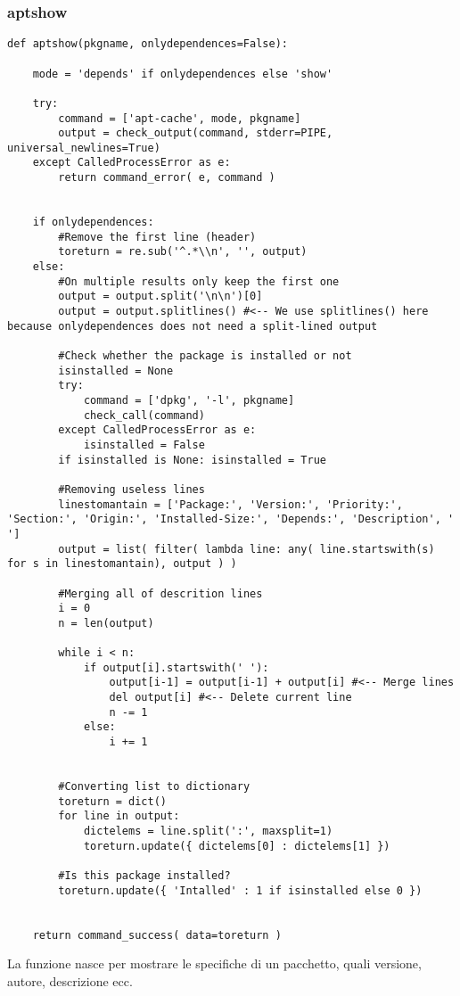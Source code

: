 \documentclass[11pt]{article}
\begin{document}
\subsubsection{aptshow}\label{aptshow}
\begin{lstlisting}
def aptshow(pkgname, onlydependences=False):
    
    mode = 'depends' if onlydependences else 'show'

    try:
        command = ['apt-cache', mode, pkgname]
        output = check_output(command, stderr=PIPE, universal_newlines=True)
    except CalledProcessError as e:
        return command_error( e, command )
    

    if onlydependences:
        #Remove the first line (header)
        toreturn = re.sub('^.*\\n', '', output)
    else:
        #On multiple results only keep the first one
        output = output.split('\n\n')[0]
        output = output.splitlines() #<-- We use splitlines() here because onlydependences does not need a split-lined output

        #Check whether the package is installed or not
        isinstalled = None
        try:
            command = ['dpkg', '-l', pkgname]
            check_call(command)
        except CalledProcessError as e:
            isinstalled = False
        if isinstalled is None: isinstalled = True
     
        #Removing useless lines
        linestomantain = ['Package:', 'Version:', 'Priority:', 'Section:', 'Origin:', 'Installed-Size:', 'Depends:', 'Description', ' ']
        output = list( filter( lambda line: any( line.startswith(s) for s in linestomantain), output ) ) 

        #Merging all of descrition lines
        i = 0
        n = len(output)

        while i < n:
            if output[i].startswith(' '):
                output[i-1] = output[i-1] + output[i] #<-- Merge lines
                del output[i] #<-- Delete current line
                n -= 1
            else:
                i += 1


        #Converting list to dictionary
        toreturn = dict()
        for line in output:
            dictelems = line.split(':', maxsplit=1)
            toreturn.update({ dictelems[0] : dictelems[1] })

        #Is this package installed?
        toreturn.update({ 'Intalled' : 1 if isinstalled else 0 })


    return command_success( data=toreturn )
\end{lstlisting}
La funzione nasce per mostrare le specifiche di un pacchetto, quali versione, autore, descrizione ecc.
\end{document}
